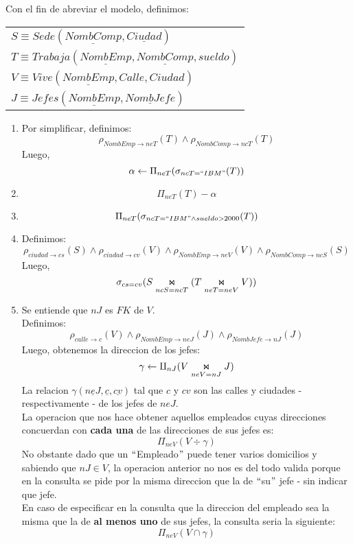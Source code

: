 Con el fin de abreviar el modelo, definimos:
\begin{center}
	\begin{tabular}{l}
		$S \equiv Sede(\underline{NombComp}, \underline{Ciudad})$\\
		$T \equiv Trabaja(\underline{NombEmp}, \underline{NombComp}, sueldo)$\\
		$V \equiv Vive(\underline{NombEmp}, Calle, Ciudad)$\\
		$J \equiv Jefes(\underline{NombEmp}, \underline{NombJefe})$\\
	\end{tabular}
\end{center}
\begin{enumerate}
	\item Por simplificar, definimos:
	$$\rho_{NombEmp\rightarrow neT} (T) \land \rho_{NombComp\rightarrow ncT} (T)$$
	Luego,
	$$\alpha \leftarrow \Pi_{neT}(\sigma_{ncT = ``IBM"} (T))$$
	
	\item
	$$\Pi_{neT}(T)-\alpha$$
	
	\item
	$$\Pi_{neT}(\sigma_{ncT = ``IBM" \land sueldo > 2000}(T))$$
	
	\item Definimos:
	$$\rho_{ciudad \rightarrow cs} (S) \land \rho_{ciudad \rightarrow cv}(V) \land \rho_{NombEmp\rightarrow neV} (V) \land \rho_{NombComp\rightarrow ncS} (S)$$
	Luego,
	$$\sigma_{cs = cv}(S\innerjoin[ncS = ncT] (T\innerjoin[neT = neV] V))$$
	
	\item Se entiende que $nJ$ es $FK$ de $V$.\\ 
	Definimos:
	$$\rho_{calle\rightarrow c}(V) \land \rho_{NombEmp\rightarrow neJ}(J) \land \rho_{NombJefe \rightarrow nJ}(J)$$
	Luego, obtenemos la direccion de los jefes:
	$$\gamma \leftarrow \amalg_{nJ}(V \innerjoin[neV = nJ] J)$$
	La relacion $\gamma (\underline{neJ}, \underline{c}, \underline{cv})$ tal que $c$ y $cv$ son las calles y ciudades - respectivamente - de los jefes de $neJ$.\\
	La operacion que nos hace obtener aquellos empleados cuyas direcciones concuerdan con \textbf{cada una} de las direcciones de sus jefes es:
	$$\Pi_{neV} (V \div \gamma)$$
	No obstante dado que un $``$Empleado$"$  puede tener varios domicilios y sabiendo que $nJ \in V$, la operacion anterior no nos es del todo valida porque en la consulta se pide por la misma direccion que la de $``$su$"$ jefe - sin indicar que jefe.\\
	En caso de especificar en la consulta que la direccion del empleado sea la misma que la de \textbf{al menos uno} de sus jefes, la consulta seria la siguiente:
	$$\Pi_{neV}(V\cap \gamma)$$
	

\end{enumerate}

